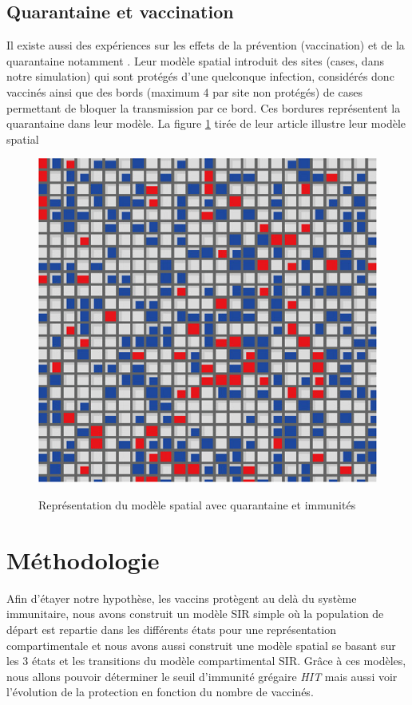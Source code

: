 \documentclass[journal, a4paper]{IEEEtran}
\begin{document}
	 \subsection{Quarantaine et vaccination}
	 Il existe aussi des expériences sur les effets de la prévention (vaccination) et de la quarantaine notamment \cite{Kato2011}. Leur modèle spatial introduit des sites (cases, dans notre simulation) qui sont protégés d'une quelconque infection, considérés donc vaccinés ainsi que des bords (maximum 4 par site non protégés) de cases permettant de bloquer la transmission par ce bord. Ces bordures représentent la quarantaine dans leur modèle. La figure \ref{fig:quarantine_model} tirée de leur article illustre leur modèle spatial
	 \begin{figure}[!hbt]
		 \caption{Représentation du modèle spatial avec quarantaine et immunités}
		 \includegraphics[width=\columnwidth]{quarantine_model}
		 \label{fig:quarantine_model}
		 \cite{Kato2011}
	 \end{figure}




\section{Méthodologie}\label{sec:met}
	Afin d'étayer notre hypothèse, les vaccins protègent au delà du système immunitaire, nous avons construit un modèle SIR simple où la population de départ est repartie dans les différents états pour une représentation compartimentale et nous avons aussi construit une modèle spatial se basant sur les 3 états et les transitions du modèle compartimental SIR.
	Grâce à ces modèles, nous allons pouvoir déterminer le seuil d'immunité grégaire \emph{HIT} mais aussi voir l'évolution de la protection en fonction du nombre de vaccinés.
\end{document}
